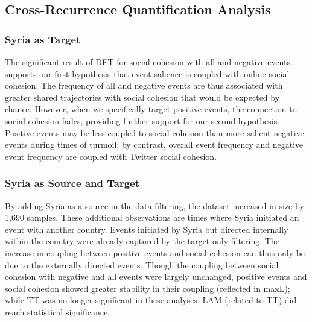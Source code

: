 \documentclass[
  english,
  man]{apa6}
\begin{document}
\hypertarget{cross-recurrence-quantification-analysis-2}{%
\subsection{Cross-Recurrence Quantification Analysis}\label{cross-recurrence-quantification-analysis-2}}

\hypertarget{syria-as-target-2}{%
\subsubsection{Syria as Target}\label{syria-as-target-2}}

The significant result of DET for social cohesion with all and negative events
supports our first hypothesis that event salience is coupled with online social
cohesion. The frequency of all and negative events are thus associated with
greater shared trajectories with social cohesion that would be expected by
chance. However, when we specifically target positive events, the connection to
social cohesion fades, providing further support for our second hypothesis.
Positive events may be less coupled to social cohesion than more salient
negative events during times of turmoil; by contrast, overall event frequency
and negative event frequency are coupled with Twitter social cohesion.

\hypertarget{syria-as-source-and-target-2}{%
\subsubsection{Syria as Source and Target}\label{syria-as-source-and-target-2}}

By adding Syria as a source in the data filtering, the dataset increased in size
by 1,690 samples. These additional observations are times where Syria initiated
an event with another country. Events initiated by Syria but directed internally
within the country were already captured by the target-only filtering. The
increase in coupling between positive events and social cohesion can thus only
be due to the externally directed events. Though the coupling between social
cohesion with negative and all events were largely unchanged, positive events
and social cohesion showed greater stability in their coupling (reflected in
maxL); while TT was no longer significant in these analyses, LAM (related to TT)
did reach statistical significance.
\end{document}
